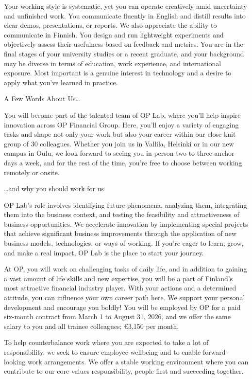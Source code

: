 \documentclass[a4paper,11pt]{article}
\begin{document}
Your working style is systematic, yet you can operate creatively amid uncertainty and unfinished work. You communicate fluently in English and distill results into clear demos, presentations, or reports. We also appreciate the ability to communicate in Finnish. You design and run lightweight experiments and objectively assess their usefulness based on feedback and metrics. You are in the final stages of your university studies or a recent graduate, and your background may be diverse in terms of education, work experience, and international exposure. Most important is a genuine interest in technology and a desire to apply what you’ve learned in practice.

A Few Words About Us…

You will become part of the talented team of OP Lab, where you'll help inspire innovation across OP Financial Group. Here, you'll enjoy a variety of engaging tasks and shape not only your work but also your career within our close-knit group of 30 colleagues. Whether you join us in Vallila, Helsinki or in our new campus in Oulu, we look forward to seeing you in person two to three anchor days a week, and for the rest of the time, you’re free to choose between working remotely or onsite.

…and why you should work for us

OP Lab's role involves identifying future phenomena, analyzing them, integrating them into the business context, and testing the feasibility and attractiveness of business opportunities. We accelerate innovation by implementing special projects that achieve significant business improvements through the application of new business models, technologies, or ways of working. If you're eager to learn, grow, and make a real impact, OP Lab is the place to start your journey.

At OP, you will work on challenging tasks of daily life, and in addition to gaining a vast amount of life skills and new expertise, you will be a part of Finland's most attractive financial industry player. With your actions and a determined attitude, you can influence your own career path here. We support your personal development and encourage you boldly! You will be employed by OP for a paid six-month contract from March 1 to August 31, 2026, and we offer the same salary to you and all trainee colleagues; €3,150 per month.

To help counterbalance work where you are expected to take a lot of responsibility, we seek to ensure employee wellbeing and to enable forward-looking work arrangements. We offer a stable working environment where you can contribute to our core values responsibility, people first and succeeding together.
\end{document}
